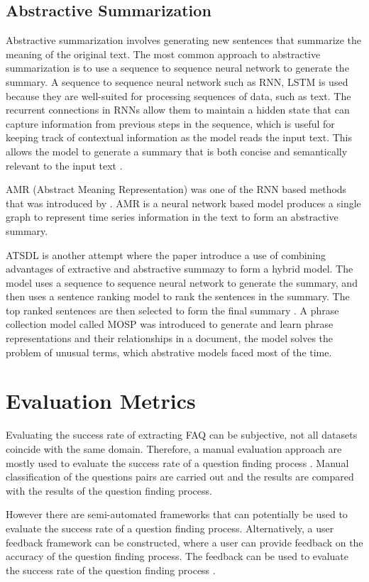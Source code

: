 \subsection{Abstractive Summarization}
Abstractive summarization involves generating new sentences that summarize the meaning of the original text. The most common approach to abstractive summarization is to use a sequence to sequence neural network to generate the summary. A sequence to sequence neural network such as RNN, LSTM is used because they are well-suited for processing sequences of data, such as text. The recurrent connections in RNNs allow them to maintain a hidden state that can capture information from previous steps in the sequence, which is useful for keeping track of contextual information as the model reads the input text. This allows the model to generate a summary that is both concise and semantically relevant to the input text \cite{ATSMACR2022}. 

AMR (Abstract Meaning Representation) was one of the RNN based methods that was introduced by \cite{banarescu-etal-2013-abstract}. AMR is a neural network based model produces a single graph to represent time series information in the text to form an abstractive summary. 

ATSDL is another attempt where the paper introduce a use of combining advantages of extractive and abstractive summazy to form a hybrid model. The model uses a sequence to sequence neural network to generate the summary, and then uses a sentence ranking model to rank the sentences in the summary. The top ranked sentences are then selected to form the final summary \cite{ATSMACR2022}. A phrase collection model called MOSP was introduced to generate and learn phrase representations and their relationships in a document, the model solves the problem of unusual terms, which abstrative models faced most of the time.

\pagebreak
\section{Evaluation Metrics}
Evaluating the success rate of extracting FAQ can be subjective, not all datasets coincide with the same domain. Therefore, a manual evaluation approach are mostly used to evaluate the success rate of a question finding process \cite{10.1145/1099554.1099571}. Manual classification of the questions pairs are carried out and the results are compared with the results of the question finding process.

However there are semi-automated frameworks that can potentially be used to evaluate the success rate of a question finding process. Alternatively, a user feedback framework can be constructed, where a user can provide feedback on the accuracy of the question finding process. The feedback can be used to evaluate the success rate of the question finding process \cite{10.1007/978-3-319-18356-5_30}.

\pagebreak
